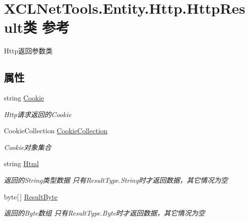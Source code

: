 \hypertarget{class_x_c_l_net_tools_1_1_entity_1_1_http_1_1_http_result}{\section{X\-C\-L\-Net\-Tools.\-Entity.\-Http.\-Http\-Result类 参考}
\label{class_x_c_l_net_tools_1_1_entity_1_1_http_1_1_http_result}
}


Http返回参数类  


\subsection*{属性}
\begin{DoxyCompactItemize}
\item 
string \hyperlink{class_x_c_l_net_tools_1_1_entity_1_1_http_1_1_http_result_a08219bb78cf5eb91045b344c91e72fad}{Cookie}
\begin{DoxyCompactList}\small\item\em Http请求返回的\-Cookie \end{DoxyCompactList}\item 
Cookie\-Collection \hyperlink{class_x_c_l_net_tools_1_1_entity_1_1_http_1_1_http_result_a30f5eb22081db0c17f2924ac0ee89156}{Cookie\-Collection}
\begin{DoxyCompactList}\small\item\em Cookie对象集合 \end{DoxyCompactList}\item 
string \hyperlink{class_x_c_l_net_tools_1_1_entity_1_1_http_1_1_http_result_a9fc43bbbeb2f24faeeab16785cd7c402}{Html}
\begin{DoxyCompactList}\small\item\em 返回的\-String类型数据 只有\-Result\-Type.\-String时才返回数据，其它情况为空 \end{DoxyCompactList}\item 
byte\mbox{[}$\,$\mbox{]} \hyperlink{class_x_c_l_net_tools_1_1_entity_1_1_http_1_1_http_result_aced655e4fc880e3123a3eb5c899a0085}{Result\-Byte}
\begin{DoxyCompactList}\small\item\em 返回的\-Byte数组 只有\-Result\-Type.\-Byte时才返回数据，其它情况为空 \end{DoxyCompactList}\item 

\end{DoxyCompactItemize}
